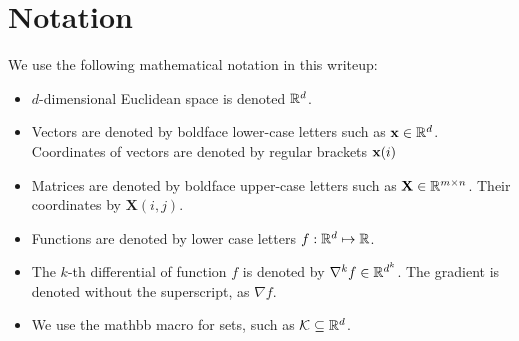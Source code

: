 \documentclass[11pt]{article}
\newtheorem{theorem}{Theorem}[section]
\newtheorem{lemma}[theorem]{Lemma}
\theoremstyle{definition}
\newtheorem{definition}[theorem]{Definition}
\theoremstyle{definition}
\newtheorem{example}[theorem]{Example}
\begin{document}
%
%
%

\section{Notation }

We use the following mathematical notation in this writeup:
\begin{itemize}
\item
$d$-dimensional  Euclidean space is denoted ${\mathbb R}^d$. 
\item
Vectors are denoted by boldface lower-case letters such as $\mathbf x \in {\mathbb R}^d$.  Coordinates of vectors are denoted by regular brackets $\mathbf x(i)$ 
\item
Matrices are denoted by boldface upper-case letters such as $\mathbf{X}  \in {\mathbb R}^{m \times n}$.  Their coordinates by $\mathbf{X}(i,j)$. 
\item
Functions are denoted by lower case letters $f: {\mathbb R}^d \mapsto {\mathbb R}$. 

\item 
The $k$-th differential of function $f$ is denoted by $\nabla^k f \in {\mathbb R}^{d^k}$.  The gradient is denoted without the superscript, as $\nabla f$. 

\item
We use the mathbb macro for sets, such as $\mathcal K \subseteq {\mathbb R}^d$.  

\end{itemize}



\end{document}
